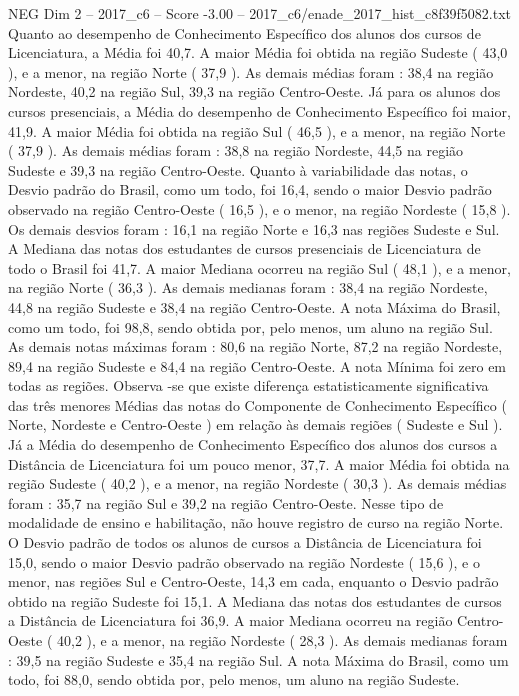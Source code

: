 \begin{textsample}{NEG Dim 2 – 2017\_c6 – Score -3.00 – 2017\_c6/enade\_2017\_hist\_c8f39f5082.txt}
Quanto ao desempenho de Conhecimento Específico dos alunos dos cursos de Licenciatura, a Média foi 40,7.
A maior Média foi obtida na região Sudeste ( 43,0 ), e a menor, na região Norte ( 37,9 ).
As demais médias foram : 38,4 na região Nordeste, 40,2 na região Sul, 39,3 na região Centro-Oeste.
Já para os alunos dos cursos presenciais, a Média do desempenho de Conhecimento Específico foi maior, 41,9.
A maior Média foi obtida na região Sul ( 46,5 ), e a menor, na região Norte ( 37,9 ).
As demais médias foram : 38,8 na região Nordeste, 44,5 na região Sudeste e 39,3 na região Centro-Oeste.
Quanto à variabilidade das notas, o Desvio padrão do Brasil, como um todo, foi 16,4, sendo o maior Desvio padrão observado na região Centro-Oeste ( 16,5 ), e o menor, na região Nordeste ( 15,8 ).
Os demais desvios foram : 16,1 na região Norte e 16,3 nas regiões Sudeste e Sul.
A Mediana das notas dos estudantes de cursos presenciais de Licenciatura de todo o Brasil foi 41,7.
A maior Mediana ocorreu na região Sul ( 48,1 ), e a menor, na região Norte ( 36,3 ).
As demais medianas foram : 38,4 na região Nordeste, 44,8 na região Sudeste e 38,4 na região Centro-Oeste.
A nota Máxima do Brasil, como um todo, foi 98,8, sendo obtida por, pelo menos, um aluno na região Sul.
As demais notas máximas foram : 80,6 na região Norte, 87,2 na região Nordeste, 89,4 na região Sudeste e 84,4 na região Centro-Oeste.
A nota Mínima foi zero em todas as regiões.
Observa -se que existe diferença estatisticamente significativa das três menores Médias das notas do Componente de Conhecimento Específico ( Norte, Nordeste e Centro-Oeste ) em relação às demais regiões ( Sudeste e Sul ).
Já a Média do desempenho de Conhecimento Específico dos alunos dos cursos a Distância de Licenciatura foi um pouco menor, 37,7.
A maior Média foi obtida na região Sudeste ( 40,2 ), e a menor, na região Nordeste ( 30,3 ).
As demais médias foram : 35,7 na região Sul e 39,2 na região Centro-Oeste.
Nesse tipo de modalidade de ensino e habilitação, não houve registro de curso na região Norte.
O Desvio padrão de todos os alunos de cursos a Distância de Licenciatura foi 15,0, sendo o maior Desvio padrão observado na região Nordeste ( 15,6 ), e o menor, nas regiões Sul e Centro-Oeste, 14,3 em cada, enquanto o Desvio padrão obtido na região Sudeste foi 15,1.
A Mediana das notas dos estudantes de cursos a Distância de Licenciatura foi 36,9.
A maior Mediana ocorreu na região Centro-Oeste ( 40,2 ), e a menor, na região Nordeste ( 28,3 ).
As demais medianas foram : 39,5 na região Sudeste e 35,4 na região Sul.
A nota Máxima do Brasil, como um todo, foi 88,0, sendo obtida por, pelo menos, um aluno na região Sudeste.

\end{textsample}
